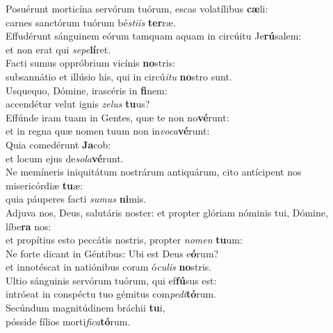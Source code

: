 \evenverse Posuérunt morticína servórum tuórum, escas volatílibus \textbf{cæ}li:~\*\\
\evenverse carnes sanctórum tuórum bé\textit{sti}\textit{is} \textbf{ter}ræ.\\
\oddverse Effudérunt sánguinem eórum tamquam aquam in circúitu Je\textbf{rú}salem:~\*\\
\oddverse et non erat qui \textit{se}\textit{pe}\textbf{lí}ret.\\
\evenverse Facti sumus oppróbrium vicínis \textbf{no}stris:~\*\\
\evenverse subsannátio et illúsio his, qui in circú\textit{i}\textit{tu} \textbf{no}stro sunt.\\
\oddverse Usquequo, Dómine, irascéris in \textbf{fi}nem:~\*\\
\oddverse accendétur velut ignis \textit{ze}\textit{lus} \textbf{tu}us?\\
\evenverse Effúnde iram tuam in Gentes, quæ te non no\textbf{vé}runt:~\*\\
\evenverse et in regna quæ nomen tuum non in\textit{vo}\textit{ca}\textbf{vé}runt:\\
\oddverse Quia comedérunt \textbf{Ja}cob:~\*\\
\oddverse et locum ejus de\textit{so}\textit{la}\textbf{vé}runt.\\
\evenverse Ne memíneris iniquitátum nostrárum antiquárum, cito antícipent nos misericórdiæ \textbf{tu}æ:~\*\\
\evenverse quia páuperes facti \textit{su}\textit{mus} \textbf{ni}mis.\\
\oddverse Adjuva nos, Deus, salutáris noster: et propter glóriam nóminis tui, Dómine, líbe\textbf{ra} nos:~\*\\
\oddverse et propítius esto peccátis nostris, propter \textit{no}\textit{men} \textbf{tu}um:\\
\evenverse Ne forte dicant in Géntibus: Ubi est Deus e\textbf{ó}rum?~\*\\
\evenverse et innotéscat in natiónibus coram ó\textit{cu}\textit{lis} \textbf{no}stris.\\
\oddverse Ultio sánguinis servórum tuórum, qui ef\textbf{fú}sus est:~\*\\
\oddverse intróeat in conspéctu tuo gémitus com\textit{pe}\textit{di}\textbf{tó}rum.\\
\evenverse Secúndum magnitúdinem bráchii \textbf{tu}i,~\*\\
\evenverse pósside fílios morti\textit{fi}\textit{ca}\textbf{tó}rum.\\
